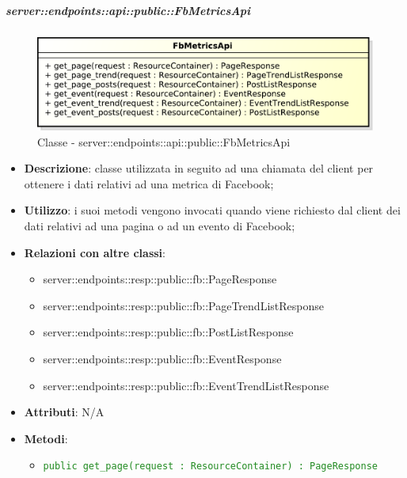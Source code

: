     \subparagraph{server::endpoints::api::public::FbMetricsApi} %
    \label{subp:bdsm_app_server_endpoints_api_public_fbmetricsapi}
	\begin{figure}[!htbp]
		\centering
		\centerline{\includegraphics[scale=0.6]{./images/server/classes/endpoints/fb_metrics_api.pdf}}
		\caption{Classe - server::endpoints::api::public::FbMetricsApi}
	\end{figure}
    \begin{itemize}
      \item \textbf{Descrizione}: classe utilizzata in seguito ad una chiamata del client per ottenere i dati relativi ad una metrica di Facebook;
      \item \textbf{Utilizzo}: i suoi metodi vengono invocati quando viene richiesto dal client dei dati relativi ad una pagina o ad un evento di Facebook;
      \item \textbf{Relazioni con altre classi}:
        \begin{itemize}
          \item server::endpoints::resp::public::fb::PageResponse
          \item server::endpoints::resp::public::fb::PageTrendListResponse
          \item server::endpoints::resp::public::fb::PostListResponse
          \item server::endpoints::resp::public::fb::EventResponse
          \item server::endpoints::resp::public::fb::EventTrendListResponse
        \end{itemize}
		  \item \textbf{Attributi}: N/A
		  \item \textbf{Metodi}:
			\begin{itemize}
				\item \textcolor{forestgreen}{\texttt{public get\_page(request : ResourceContainer) : PageResponse}}

\end{itemize}
\end{itemize}
